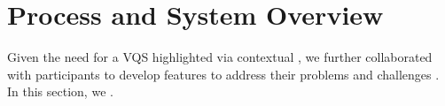  
 \section{ Process and System Overview\label{sec:pd_findings}}
 Given the need for a VQS highlighted via contextual , we further collaborated with participants to develop features to address their problems and challenges . In this section, we .
